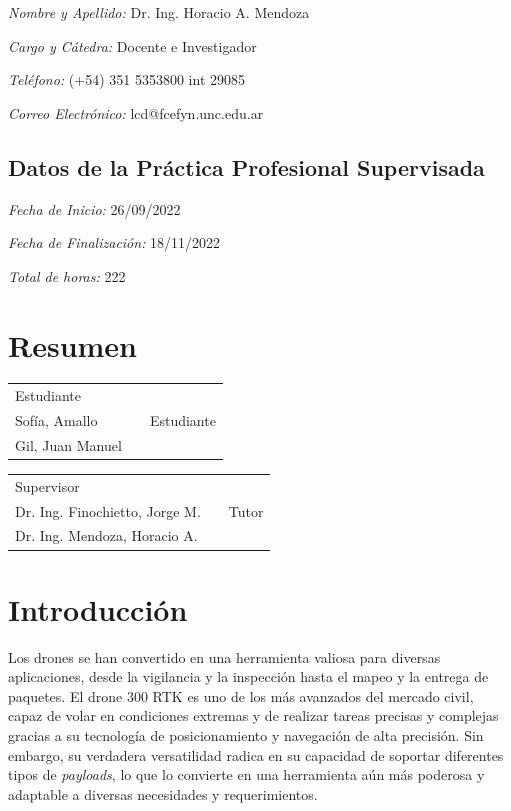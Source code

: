 \documentclass[12pt]{article}
\begin{document}
\textsl{Nombre y Apellido:} Dr. Ing. Horacio A. Mendoza

\textsl{Cargo y Cátedra:} Docente e Investigador

\textsl{Teléfono:} (+54) 351 5353800 int 29085

\textsl{Correo Electrónico:} lcd@fcefyn.unc.edu.ar

\subsection{Datos de la Práctica Profesional Supervisada}

\textsl{Fecha de Inicio:} 26/09/2022

\textsl{Fecha de Finalización:} 18/11/2022

\textsl{Total de horas:} 222

\tableofcontents
\newpage

\justifying
\section{Resumen}
 

\vspace{1.5cm}
\begin{tabular}{p{5.5cm}cp{5.5cm}}
  \cline{1-1} \cline{3-3} \\
  \centering Estudiante   \\ Sofía, Amallo && \centering Estudiante \\ Gil, Juan Manuel
\end{tabular}

\vspace{1.5cm}

\begin{tabular}{p{5.5cm}cp{5.5cm}}
  \cline{1-1} \cline{3-3} \\
  \centering Supervisor   \\ Dr. Ing. Finochietto, Jorge M. && \centering Tutor \\ Dr. Ing. Mendoza, Horacio A.
\end{tabular}

\setlength\parindent{24pt}
\newpage
\section{Introducción}

Los drones se han convertido en una herramienta valiosa para diversas aplicaciones, desde la vigilancia y la inspección hasta el mapeo y la entrega de paquetes. El drone 300 RTK es uno de los más avanzados del mercado civil, capaz de volar en condiciones extremas y de realizar tareas precisas y complejas gracias a su tecnología de posicionamiento y navegación de alta precisión. Sin embargo, su verdadera versatilidad radica en su capacidad de soportar diferentes tipos de \textit{payloads}, lo que lo convierte en una herramienta aún más poderosa y adaptable a diversas necesidades y requerimientos.
\end{document}
